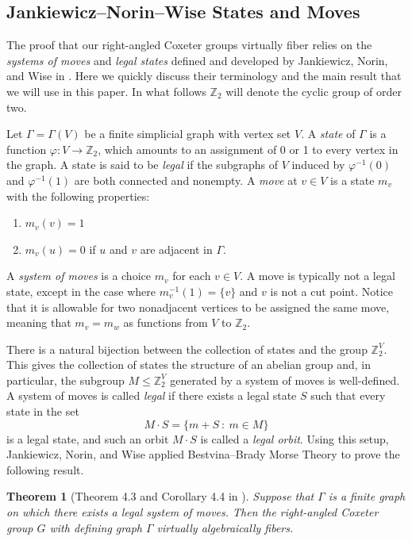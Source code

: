 \documentclass[12pt, letterpaper]{article}
\newcommand{\Z}{\mathbb{Z}}
\newcommand{\G}{\Gamma}
\newcommand{\var}{\varphi}
\def\Z{\mathbb{Z}}
\theoremstyle{plain}
\newtheorem{thm}{Theorem}[section]
\theoremstyle{definition}
\begin{document}
\subsection{Jankiewicz--Norin--Wise States and Moves}\label{sec:JNW}

The proof that our right-angled Coxeter groups virtually fiber relies on the \emph{systems of moves} and \emph{legal states} defined and developed by Jankiewicz, Norin, and Wise in \cite{JNW}. Here we quickly discuss their terminology and the main result that we will use in this paper. In what follows $\Z_2$ will denote the cyclic group of order two.

Let $\G = \G(V)$ be a finite simplicial graph with vertex set $V$. A \emph{state} of $\G$ is a function ${\var \colon V \to \Z_2}$, which amounts to an assignment of 0 or 1 to every vertex in the graph. A state is said to be \emph{legal} if the subgraphs of $V$ induced by $\var^{-1}(0)$ and $\var^{-1}(1)$ are both connected and nonempty. A \emph{move} at $v \in V$ is a state $m_v$ with the following properties:
    \begin{enumerate}
        \item $m_v (v) = 1$
        \item  $m_v(u) = 0$ if $u$ and $v$ are adjacent in $\G$.
    \end{enumerate}
A \emph{system of moves} is a choice $m_v$ for each $v \in V$. A move is typically not a legal state, except in the case where $m_v^{-1}(1) = \{v\}$ and $v$ is not a cut point. Notice that it is allowable for two nonadjacent vertices to be assigned the same move, meaning that $m_v = m_w$ as functions from $V$ to $\Z_2$.

There is a natural bijection between the collection of states and the group $\Z_2^V$. This gives the collection of states the structure of an abelian group and, in particular, the subgroup $M \le \Z_2^V$ generated by a system of moves is well-defined. A system of moves is called \emph{legal} if there exists a legal state $S$ such that every state in the set
    \[ M \cdot S = \{ m + S\ :\ m \in M \} \]
is a legal state, and such an orbit $M \cdot S$ is called a \emph{legal orbit}. Using this setup, Jankiewicz, Norin, and Wise applied Bestvina--Brady Morse Theory \cite{BB} to prove the following result.

\begin{thm}[Theorem 4.3 and Corollary 4.4 in \cite{JNW}]\label{thm:JNW}
    Suppose that $\G$ is a finite graph on which there exists a legal system of moves. Then the right-angled Coxeter group $G$ with defining graph $\G$ virtually algebraically fibers.  
\end{thm}
\end{document}
